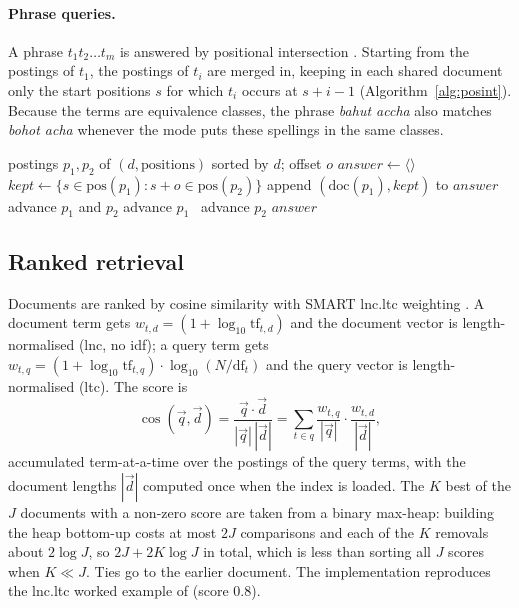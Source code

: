 \paragraph{Phrase queries.} A phrase $t_1t_2\ldots t_m$ is answered by positional intersection
\citep[Figure~2.12]{manning2008iir}. Starting from the postings of $t_1$, the postings of $t_i$ are
merged in, keeping in each shared document only the start positions $s$ for which $t_i$ occurs at
$s+i-1$ (Algorithm~\ref{alg:posint}). Because the terms are equivalence classes, the phrase
\textit{bahut accha} also matches \textit{bohot acha} whenever the mode puts these spellings in the
same classes.

\begin{algorithm}[t]
\caption{Positional intersection with an offset}
\label{alg:posint}
\begin{algorithmic}[1]
\Require postings $p_1,p_2$ of $(d,\text{positions})$ sorted by $d$; offset $o$
\State $\mathit{answer}\gets\langle\rangle$
    \State $\mathit{kept}\gets\{s\in\mathrm{pos}(p_1) : s+o\in\mathrm{pos}(p_2)\}$
     append $(\mathrm{doc}(p_1),\mathit{kept})$ to $\mathit{answer}$ \EndIf
    \State advance $p_1$ and $p_2$
   advance $p_1$
  \Else\ advance $p_2$
  \EndIf
\EndWhile
\State \Return $\mathit{answer}$
\end{algorithmic}
\end{algorithm}

\subsection{Ranked retrieval}
\label{sec:ranking}

Documents are ranked by cosine similarity with SMART lnc.ltc weighting
\citep[Section~6.4.3]{manning2008iir}. A document term gets
$w_{t,d}=(1+\log_{10}\mathrm{tf}_{t,d})$ and the document vector is length-normalised (lnc, no
idf); a query term gets $w_{t,q}=(1+\log_{10}\mathrm{tf}_{t,q})\cdot\log_{10}(N/\mathrm{df}_t)$ and
the query vector is length-normalised (ltc). The score is
\begin{equation}
\cos(\vec q,\vec d)=\frac{\vec q\cdot\vec d}{|\vec q|\,|\vec d|}
=\sum_{t\in q}\frac{w_{t,q}}{|\vec q|}\cdot\frac{w_{t,d}}{|\vec d|},
\end{equation}
accumulated term-at-a-time over the postings of the query terms, with the document lengths
$|\vec d|$ computed once when the index is loaded. The $K$ best of the $J$ documents with a non-zero
score are taken from a binary max-heap: building the heap bottom-up costs at most $2J$ comparisons
and each of the $K$ removals about $2\log J$, so $2J+2K\log J$ in total, which is less than sorting
all $J$ scores when $K\ll J$. Ties go to the earlier document. The implementation reproduces the
lnc.ltc worked example of \citet[Section~6.4.3]{manning2008iir} (score 0.8).

